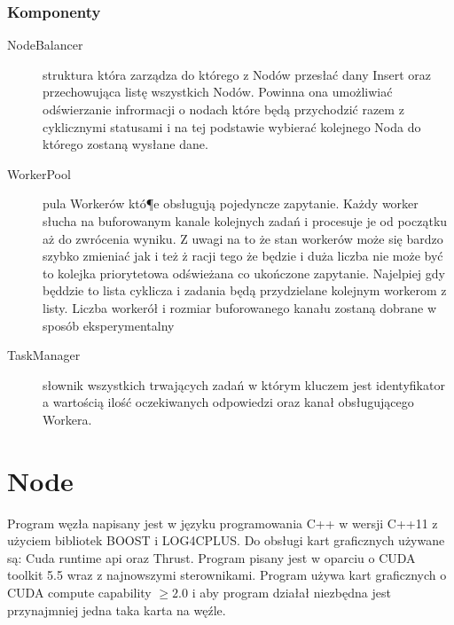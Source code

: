 \documentclass[paper=a4, fontsize=11pt]{scrartcl} %
\numberwithin{equation}{section} %
\numberwithin{figure}{section} %
\numberwithin{table}{section} %
\begin{document}
	\subsubsection{Komponenty}
		\begin{description}
		    \item[NodeBalancer] struktura która zarządza do którego z Nodów przesłać dany Insert oraz przechowująca listę wszystkich Nodów.
		    Powinna ona umożliwiać odświerzanie infrormacji o nodach które będą przychodzić razem z cyklicznymi statusami i na tej podstawie
		    wybierać kolejnego Noda do którego zostaną wysłane dane. 
		    \item[WorkerPool] pula Workerów któ¶e obsługują pojedyncze zapytanie. Każdy worker słucha na buforowanym kanale kolejnych zadań i 
		    procesuje je od początku aż do zwrócenia wyniku. Z uwagi na to że stan workerów może się bardzo szybko zmieniać jak i też ż racji tego
		    że będzie i duża liczba nie może być to kolejka priorytetowa odświeżana co ukończone zapytanie. Najelpiej gdy będdzie to lista cyklicza
		    i zadania będą przydzielane kolejnym workerom z listy. Liczba workerół i rozmiar buforowanego kanału zostaną dobrane w sposób eksperymentalny
		    \item[TaskManager] słownik wszystkich trwających zadań w którym kluczem jest identyfikator a wartością ilość oczekiwanych odpowiedzi 
		    oraz kanał obsługującego  Workera.
		\end{description}					

\section{Node}
	Program węzła napisany jest w języku programowania C++ w wersji C++11 z użyciem bibliotek BOOST i LOG4CPLUS. Do obsługi kart 
	graficznych używane są: Cuda runtime api oraz Thrust. Program pisany jest w oparciu o CUDA toolkit 5.5 wraz z najnowszymi sterownikami. 
	Program używa kart graficznych o CUDA compute capability $\geq 2.0$ i aby program działał niezbędna jest przynajmniej jedna taka karta na węźle.   
\end{document}
